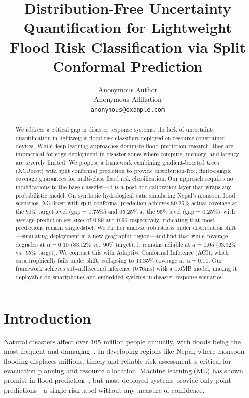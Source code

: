 \documentclass{article}
\title{Distribution-Free Uncertainty Quantification for Lightweight Flood Risk Classification via Split Conformal Prediction}
\author{
  Anonymous Author \\
  Anonymous Affiliation \\
  \texttt{anonymous@example.com}
}
\begin{document}
\maketitle

\begin{abstract}
We address a critical gap in disaster response systems: the lack of uncertainty quantification in lightweight flood risk classifiers deployed on resource-constrained devices. While deep learning approaches dominate flood prediction research, they are impractical for edge deployment in disaster zones where compute, memory, and latency are severely limited. We propose a framework combining gradient-boosted trees (XGBoost) with split conformal prediction to provide distribution-free, finite-sample coverage guarantees for multi-class flood risk classification. Our approach requires no modifications to the base classifier---it is a post-hoc calibration layer that wraps any probabilistic model. On synthetic hydrological data simulating Nepal's monsoon flood scenarios, XGBoost with split conformal prediction achieves 89.25\% actual coverage at the 90\% target level (gap = 0.75\%) and 95.25\% at the 95\% level (gap = 0.25\%), with average prediction set sizes of 0.89 and 0.96 respectively, indicating that most predictions remain single-label. We further analyze robustness under distribution shift---simulating deployment in a new geographic region---and find that while coverage degrades at $\alpha=0.10$ (83.02\% vs.\ 90\% target), it remains reliable at $\alpha=0.05$ (93.92\% vs.\ 95\% target). We contrast this with Adaptive Conformal Inference (ACI), which catastrophically fails under shift, collapsing to 13.35\% coverage at $\alpha=0.10$. Our framework achieves sub-millisecond inference (0.76ms) with a 1.6MB model, making it deployable on smartphones and embedded systems in disaster response scenarios.
\end{abstract}

\section{Introduction}

Natural disasters affect over 165 million people annually, with floods being the most frequent and damaging~\cite{emdat2024}. In developing regions like Nepal, where monsoon flooding displaces millions, timely and reliable risk assessment is critical for evacuation planning and resource allocation. Machine learning (ML) has shown promise in flood prediction~\cite{floodgenome2025, flood_susceptibility2025}, but most deployed systems provide only point predictions---a single risk label without any measure of confidence.
\end{document}
